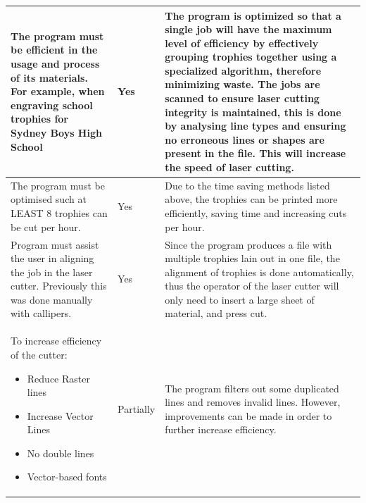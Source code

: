 \documentclass[oneside,openany,11pt,a4paper]{report}
\begin{document}
\begin{longtable}{|p{4cm}|p{2cm}|p{8cm}|}
	The program must be efficient in the usage and process of its materials. For example, when engraving school trophies for Sydney Boys High School & 
	Yes &
	The program is optimized so that a single job will have the maximum level of efficiency by effectively grouping trophies together using a specialized algorithm, therefore minimizing waste. \newline The jobs are scanned to ensure laser cutting integrity is maintained, this is done by analysing line types and ensuring no erroneous lines or shapes are present in the file. This will increase the speed of laser cutting. \\ \hline
	
	The program must be optimised such at LEAST 8 trophies can be cut per hour. &
	Yes &
	Due to the time saving methods listed above, the trophies can be printed more efficiently, saving time and increasing cuts per hour.
	\\ \hline
	
	Program must assist the user in aligning the job in the laser cutter. Previously this was done manually with callipers. &
	Yes &
	Since the program produces a file with multiple trophies lain out in one file, the alignment of trophies is done automatically, thus the operator of the laser cutter will only need to insert a large sheet of material, and press cut.
	\\ \hline
	
	To increase efficiency of the cutter:
	\begin{itemize}
		\itemsep0em
		\item Reduce Raster lines
		\item Increase Vector Lines
		\item No double lines
		\item Vector-based fonts
	\end{itemize} &
	Partially &
	The program filters out some duplicated lines and removes invalid lines. However, improvements can be made in order to further increase efficiency.
	\\ \hline
	

\end{longtable}
\end{document}
